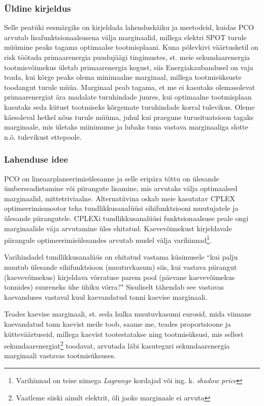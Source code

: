 \documentclass[10pt,a4paper]{article}
\begin{document}
\subsubsection{Üldine kirjeldus}
Selle peatüki eesmärgiks on kirjeldada lahenduskäiku ja meetodeid, kuidas PCO arvutab lisafunktsionaalsusena välja marginaalid, millega elektri SPOT turule müümine peaks tagama optimaalse tootmisplaani. Kuna põlevkivi väärtusketil on risk töötada primaarenergia puudujäägi tingimustes, st. meie sekundaarenergia tootmisvõimekus ületab primaarenergia kogust, siis Energiakaubandusel on vaja teada, kui kõrge peaks olema minimaalne marginaal, millega tootmisüksuste toodangut turule müüa. Marginaal peab tagama, et me ei kasutaks olemasolevat primaarenergiat ära madalate turuhindade juures, kui optimaalne tootmisplaan kasutaks seda kütust tootmiseks kõrgemate turuhindade korral tulevikus. Oleme käesoleval hetkel nõus turule müüma, juhul kui praegune turusituatsioon tagaks marginaale, mis ületaks miinimume ja lubaks tuua vastava marginaaliga slotte n.ö. tulevikust ettepoole. 
\subsubsection{Lahenduse idee}

PCO on lineaarplaneerimisülesanne ja selle eripära tõttu on ülesande ümber\-seadistamine või piirangute lisamine, mis arvutaks välja optimaalsed marginaalid, mittetriviaalne. Alternatiivina oskab meie kasutatav CPLEX optimeerimismootor teha tundlikkusanalüüsi sihifunktsiooni muutujatele ja ülesande piirangutele. CPLEXi tundlikkusanalüüsi funktsionaalsuse peale ongi marginaalide väja arvutamine üles ehitatud. Kaevevõimekust kirjeldavale piirangule optimeerimisülesandes arvutab mudel välja varihinnad\footnote{Varihinnad on teise nimega \emph{Lagrange} kordajad või ing. k. \emph{shadow price}}. 

Varihindadel tundlikkusanalüüs on ehitatud vastama küsimusele ``kui palju muutub ülesande sihifunktsioon (muutuvkasum) siis, kui vastava piirangut (kaevevõimekus) kirjeldava võrratuse parem pool (päevane kaevevõimekus tonnides) suureneks ühe ühiku võrra?" Sisuliselt tähendab see vastavas kaevanduses vastaval kuul kaevandatud tonni kaevise marginaali. 

Teades kaevise marginaali, st. seda hulka muutuvkasumi eurosid, mida viimane kaevandatud tonn kaevist meile toob, saame me, teades proportsioone ja kütteväärtuseid, millega kaevist tootestatakse ning tootmisüksusi, mis sellest sekundaarenergiat\footnote{Vaatleme siiski ainult elektrit, õli jaoks marginaale ei arvuta} toodavat, arvutada läbi kasuteguri sekundaarenergia marginaali vastavas tootmisüksuses.
\end{document}
